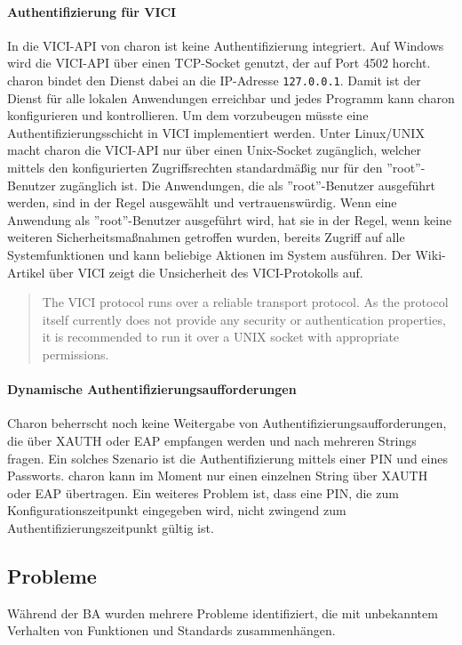 {\paragraph{Authentifizierung für VICI}
In die \ac{VICI}-\ac{API} von charon ist keine Authentifizierung integriert.
Auf Windows wird die \ac{VICI}-\ac{API} über einen TCP-Socket genutzt, der auf Port 4502
horcht. charon bindet den Dienst dabei an die \ac{IP}-Adresse \texttt{127.0.0.1}.
Damit ist der Dienst für alle lokalen Anwendungen erreichbar und jedes Programm
kann charon konfigurieren und kontrollieren.
Um dem vorzubeugen müsste eine Authentifizierungsschicht in \ac{VICI} implementiert werden.
Unter Linux/UNIX macht charon die \ac{VICI}-\ac{API} nur über einen Unix-Socket
zugänglich, welcher mittels den konfigurierten Zugriffsrechten standardmäßig
nur für den ''root''-Benutzer zugänglich ist. Die Anwendungen, die als ''root''-Benutzer
ausgeführt werden, sind in der Regel ausgewählt und vertrauenswürdig.  Wenn eine Anwendung
als ''root''-Benutzer ausgeführt wird, hat sie in der Regel, wenn keine weiteren Sicherheitsmaßnahmen getroffen
wurden, bereits Zugriff auf alle Systemfunktionen und kann beliebige Aktionen im System ausführen.
Der Wiki-Artikel über \ac{VICI} zeigt die Unsicherheit des \ac{VICI}-Protokolls auf.
\begin{quote}
The VICI protocol runs over a reliable transport protocol. As the protocol itself currently does not provide any security or authentication properties, it is recommended to run it over a UNIX socket with appropriate permissions.
\end{quote}\cite[][]{_vici_2016}
\paragraph{Dynamische Authentifizierungsaufforderungen}
Charon beherrscht noch keine Weitergabe von Authentifizierungsaufforderungen,
die über XAUTH oder EAP empfangen werden und nach mehreren Strings fragen.
Ein solches Szenario ist die Authentifizierung mittels einer PIN und eines Passworts.
charon kann im Moment nur einen einzelnen String über XAUTH oder EAP übertragen.
Ein weiteres Problem ist, dass eine PIN, die zum Konfigurationszeitpunkt
eingegeben wird, nicht zwingend zum Authentifizierungszeitpunkt gültig ist.

\subsection{Probleme}
Während der \ac{BA} wurden mehrere Probleme identifiziert, die mit unbekanntem
Verhalten von Funktionen und Standards zusammenhängen.
}
